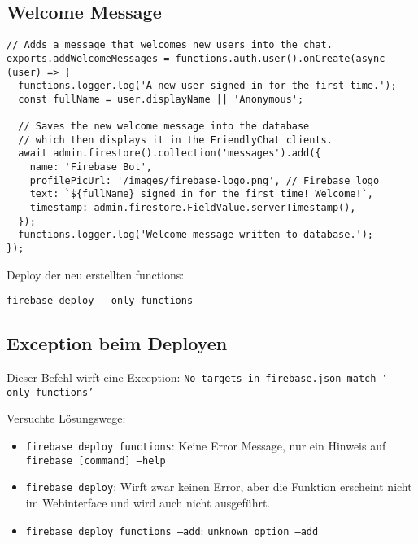\subsection{Welcome Message}
\begin{verbatim}
// Adds a message that welcomes new users into the chat.
exports.addWelcomeMessages = functions.auth.user().onCreate(async (user) => {
  functions.logger.log('A new user signed in for the first time.');
  const fullName = user.displayName || 'Anonymous';

  // Saves the new welcome message into the database
  // which then displays it in the FriendlyChat clients.
  await admin.firestore().collection('messages').add({
    name: 'Firebase Bot',
    profilePicUrl: '/images/firebase-logo.png', // Firebase logo
    text: `${fullName} signed in for the first time! Welcome!`,
    timestamp: admin.firestore.FieldValue.serverTimestamp(),
  });
  functions.logger.log('Welcome message written to database.');
});
\end{verbatim}

Deploy der neu erstellten functions:
\begin{verbatim}
firebase deploy --only functions
\end{verbatim}

\subsection{Exception beim Deployen}
Dieser Befehl wirft eine Exception: 
\texttt{No targets in firebase.json match ‘--only functions’}

Versuchte Lösungswege:
\begin{itemize}
    \item \texttt{firebase deploy functions}: Keine Error Message, nur ein Hinweis auf \texttt{firebase [command] --help}
    \item \texttt{firebase deploy}: Wirft zwar keinen Error, aber die Funktion erscheint nicht im Webinterface und wird auch nicht ausgeführt.
    \item \texttt{firebase deploy functions --add}: \texttt{unknown option --add}
\end{itemize}
